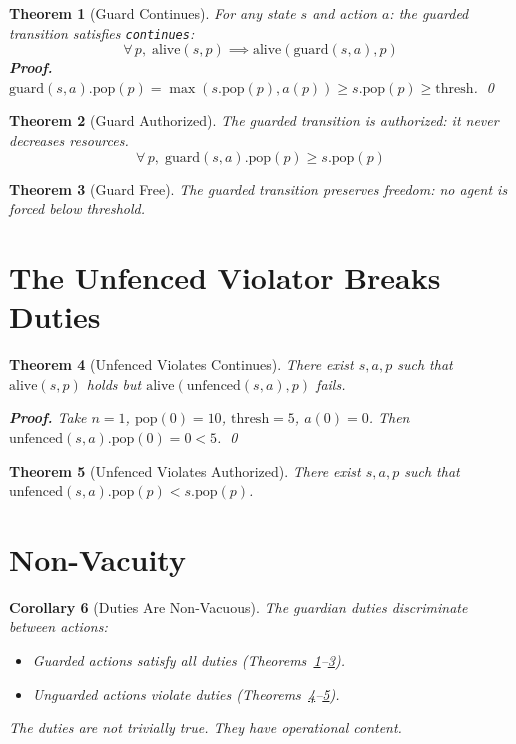 \documentclass[12pt,a4paper]{article}
\newtheorem{theorem}{Theorem}[section]
\newtheorem{corollary}[theorem]{Corollary}
\begin{document}
\begin{theorem}[Guard Continues]\label{thm:continues}
For any state $s$ and action $a$: the guarded transition satisfies
\texttt{continues}:
\[
\forall\, p,\; \text{alive}(s, p) \implies \text{alive}(\text{guard}(s, a), p)
\]
\textbf{Proof.} $\text{guard}(s, a).\text{pop}(p) = \max(s.\text{pop}(p), a(p))
\geq s.\text{pop}(p) \geq \text{thresh}$. \qed
\end{theorem}

\begin{theorem}[Guard Authorized]\label{thm:auth}
The guarded transition is authorized: it never decreases resources.
\[
\forall\, p,\; \text{guard}(s, a).\text{pop}(p) \geq s.\text{pop}(p)
\]
\end{theorem}

\begin{theorem}[Guard Free]\label{thm:free}
The guarded transition preserves freedom: no agent is forced below threshold.
\end{theorem}

\section{The Unfenced Violator Breaks Duties}

\begin{theorem}[Unfenced Violates Continues]\label{thm:ufcont}
There exist $s, a, p$ such that $\text{alive}(s, p)$ holds but
$\text{alive}(\text{unfenced}(s, a), p)$ fails.

\textbf{Proof.} Take $n = 1$, $\text{pop}(0) = 10$, $\text{thresh} = 5$,
$a(0) = 0$. Then $\text{unfenced}(s, a).\text{pop}(0) = 0 < 5$. \qed
\end{theorem}

\begin{theorem}[Unfenced Violates Authorized]\label{thm:ufauth}
There exist $s, a, p$ such that $\text{unfenced}(s, a).\text{pop}(p) < s.\text{pop}(p)$.
\end{theorem}

\section{Non-Vacuity}

\begin{corollary}[Duties Are Non-Vacuous]\label{cor:nonvac}
The guardian duties discriminate between actions:
\begin{itemize}
    \item Guarded actions satisfy all duties (Theorems~\ref{thm:continues}--\ref{thm:free}).
    \item Unguarded actions violate duties (Theorems~\ref{thm:ufcont}--\ref{thm:ufauth}).
\end{itemize}
The duties are not trivially true. They have operational content.
\end{corollary}
\end{document}
